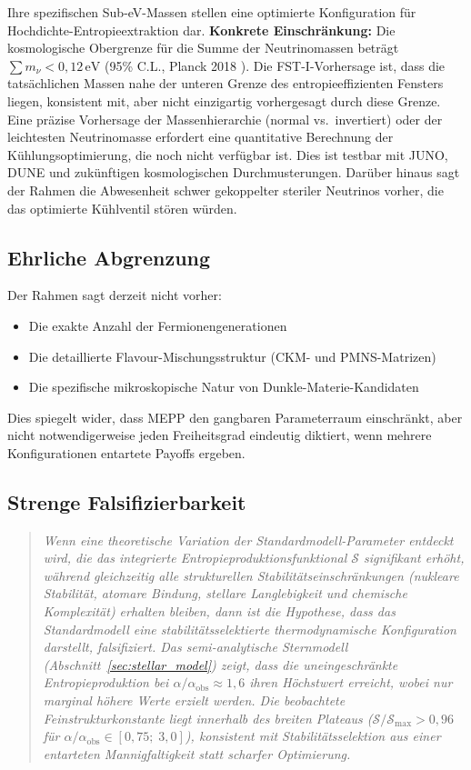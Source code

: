 \documentclass[12pt,a4paper]{article}
\theoremstyle{remark}
\begin{document}
Ihre spezifischen Sub-eV-Massen stellen eine optimierte Konfiguration f\"ur Hochdichte-Entropieextraktion dar. \textbf{Konkrete Einschr\"ankung:} Die kosmologische Obergrenze f\"ur die Summe der Neutrinomassen betr\"agt $\sum m_\nu < 0{,}12\,\text{eV}$ (95\% C.L., Planck 2018 \citep{Planck2018}). Die FST-I-Vorhersage ist, dass die tats\"achlichen Massen nahe der unteren Grenze des entropieeffizienten Fensters liegen, konsistent mit, aber nicht einzigartig vorhergesagt durch diese Grenze. Eine pr\"azise Vorhersage der Massenhierarchie (normal vs.\ invertiert) oder der leichtesten Neutrinomasse erfordert eine quantitative Berechnung der K\"uhlungsoptimierung, die noch nicht verf\"ugbar ist. Dies ist testbar mit JUNO, DUNE und zuk\"unftigen kosmologischen Durchmusterungen. Dar\"uber hinaus sagt der Rahmen die Abwesenheit schwer gekoppelter steriler Neutrinos vorher, die das optimierte K\"uhlventil st\"oren w\"urden.

\subsection{Ehrliche Abgrenzung}

Der Rahmen sagt derzeit nicht vorher:
\begin{itemize}
    \item Die exakte Anzahl der Fermionengenerationen
    \item Die detaillierte Flavour-Mischungsstruktur (CKM- und PMNS-Matrizen)
    \item Die spezifische mikroskopische Natur von Dunkle-Materie-Kandidaten
\end{itemize}

Dies spiegelt wider, dass MEPP den gangbaren Parameterraum einschr\"ankt, aber nicht notwendigerweise jeden Freiheitsgrad eindeutig diktiert, wenn mehrere Konfigurationen entartete Payoffs ergeben.

\subsection{Strenge Falsifizierbarkeit}

\begin{quote}
\textit{Wenn eine theoretische Variation der Standardmodell-Parameter entdeckt wird, die das integrierte Entropieproduktionsfunktional $\mathcal{S}$ signifikant erh\"oht, w\"ahrend gleichzeitig alle strukturellen Stabilit\"atseinschr\"ankungen (nukleare Stabilit\"at, atomare Bindung, stellare Langlebigkeit und chemische Komplexit\"at) erhalten bleiben, dann ist die Hypothese, dass das Standardmodell eine stabilit\"atsselektierte thermodynamische Konfiguration darstellt, falsifiziert. Das semi-analytische Sternmodell (Abschnitt~\ref{sec:stellar_model}) zeigt, dass die uneingeschr\"ankte Entropieproduktion bei $\alpha/\alpha_{\mathrm{obs}} \approx 1{,}6$ ihren H\"ochstwert erreicht, wobei nur marginal h\"ohere Werte erzielt werden. Die beobachtete Feinstrukturkonstante liegt innerhalb des breiten Plateaus ($\mathcal{S}/\mathcal{S}_{\max} > 0{,}96$ f\"ur $\alpha/\alpha_{\mathrm{obs}} \in [0{,}75;\; 3{,}0]$), konsistent mit Stabilit\"atsselektion aus einer entarteten Mannigfaltigkeit statt scharfer Optimierung.}
\end{quote}
\end{document}
